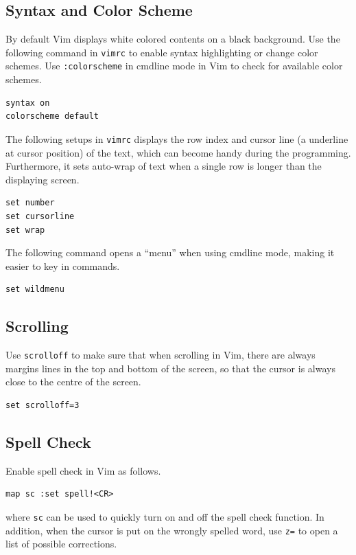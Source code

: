\subsection{Syntax and Color Scheme}

By default Vim displays white colored contents on a black background. Use the following command in \verb|vimrc| to enable syntax highlighting or change color schemes. Use \verb|:colorscheme| in cmdline mode in Vim to check for available color schemes.
\begin{lstlisting}
syntax on
colorscheme default
\end{lstlisting}

The following setups in \verb|vimrc| displays the row index and cursor line (a underline at cursor position) of the text, which can become handy during the programming. Furthermore, it sets auto-wrap of text when a single row is longer than the displaying screen.
\begin{lstlisting}
set number
set cursorline
set wrap
\end{lstlisting}

The following command opens a ``menu'' when using cmdline mode, making it easier to key in commands.
\begin{lstlisting}
set wildmenu
\end{lstlisting}

\subsection{Scrolling}

Use \verb|scrolloff| to make sure that when scrolling in Vim, there are always margins lines in the top and bottom of the screen, so that the cursor is always close to the centre of the screen.
\begin{lstlisting}
set scrolloff=3
\end{lstlisting}

\subsection{Spell Check}

Enable spell check in Vim as follows.
\begin{lstlisting}
map sc :set spell!<CR>
\end{lstlisting}
where \verb|sc| can be used to quickly turn on and off the spell check function. In addition, when the cursor is put on the wrongly spelled word, use \verb|z=| to open a list of possible corrections.

